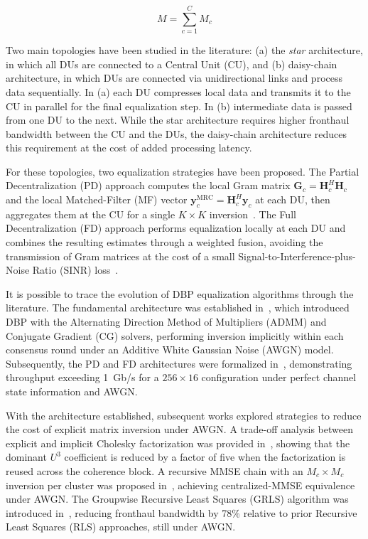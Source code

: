 \documentclass[12pt]{article}
\begin{document}
\begin{equation}
M = \sum_{c=1}^{C} M_c    
\end{equation}

Two main topologies have been studied in the literature: (a) the \emph{star} architecture, in which all DUs are connected to a Central Unit (CU), and (b) daisy-chain architecture, in which DUs are connected via unidirectional links and process data sequentially. In (a) each DU compresses local data and transmits it to the CU in parallel for the final equalization step. In (b) intermediate data is passed from one DU to the next. While the star architecture requires higher fronthaul bandwidth between the CU and the DUs, the daisy-chain architecture reduces this requirement at the cost of added processing latency.

For these topologies, two equalization strategies have been proposed. The Partial Decentralization (PD) approach computes the local Gram matrix
$\mathbf{G}_c = \mathbf{H}_c^H\mathbf{H}_c$ and the local Matched-Filter
(MF) vector $\mathbf{y}_c^{\text{MRC}} = \mathbf{H}_c^H\mathbf{y}_c$
at each DU, then aggregates them at the CU for a single $K \times K$
inversion~\cite{jeon2019}.
The Full Decentralization (FD) approach performs equalization locally at each
DU and combines the resulting estimates through a weighted fusion, avoiding the
transmission of Gram matrices at the cost of a small Signal-to-Interference-plus-Noise
Ratio (SINR) loss~\cite{jeon2019}.

It is possible to trace the evolution of DBP equalization algorithms through the literature. The fundamental architecture was established
in~\cite{decentralized2017}, which introduced DBP with the Alternating Direction
Method of Multipliers (ADMM) and Conjugate Gradient (CG) solvers, performing
inversion implicitly within each consensus round under an Additive White Gaussian
Noise (AWGN) model. Subsequently, the PD and FD architectures were formalized
in~\cite{jeon2019}, demonstrating throughput exceeding 1~Gb/s for a
$256 \times 16$ configuration under perfect channel state information and AWGN.

With the architecture established, subsequent works explored strategies to reduce
the cost of explicit matrix inversion under AWGN. A trade-off analysis between
explicit and implicit Cholesky factorization was provided in~\cite{li-tradeofs},
showing that the dominant $U^3$ coefficient is reduced by a factor of five when
the factorization is reused across the coherence block. A recursive MMSE chain
with an $M_c \times M_c$ inversion per cluster was proposed in~\cite{zheng2022},
achieving centralized-MMSE equivalence under AWGN. The Groupwise Recursive
Least Squares (GRLS) algorithm was introduced in~\cite{chen2024grls}, reducing
fronthaul bandwidth by 78\% relative to prior Recursive Least Squares (RLS)
approaches, still under AWGN.
\end{document}
